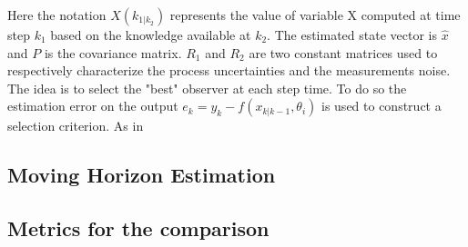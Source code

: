 Here the notation $X(k_{1|k_2})$ represents the value of variable X computed at time step $k_1$ based on the knowledge available at $k_2$. The estimated state vector is $\hat{x}$ and $P$ is the covariance matrix. $R_1$ and $R_2$ are two constant matrices used to respectively characterize the process uncertainties and the measurements noise.\\


The idea is to select the "best" observer at each step time. To do so the estimation error on the output $e_k = y_k - f(x_{k|k-1}, \theta_i)$ is used to construct a selection criterion. As in \cite{petriImprovingEstimationPerformance2022}



\subsection{Moving Horizon Estimation}

\subsection{Metrics for the comparison}